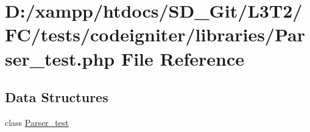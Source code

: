 \hypertarget{_parser__test_8php}{}\section{D\+:/xampp/htdocs/\+S\+D\+\_\+\+Git/\+L3\+T2/\+F\+C/tests/codeigniter/libraries/\+Parser\+\_\+test.php File Reference}
\label{_parser__test_8php}
\subsection*{Data Structures}
\begin{DoxyCompactItemize}
\item 
class \hyperlink{class_parser__test}{Parser\+\_\+test}
\end{DoxyCompactItemize}
